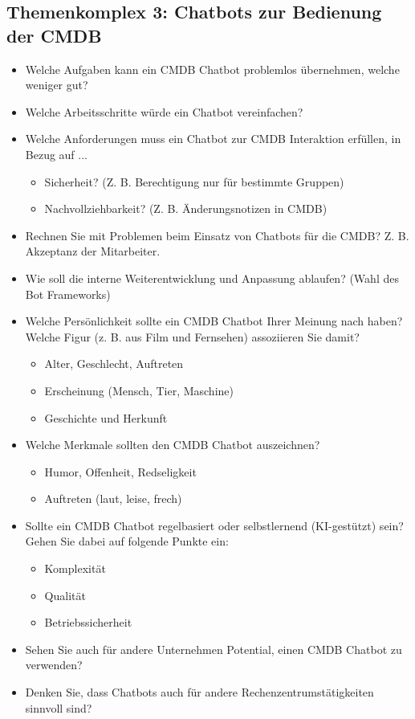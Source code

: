 \subsection*{Themenkomplex 3: Chatbots zur Bedienung der CMDB}
\begin{itemize}
  \item Welche Aufgaben kann ein CMDB Chatbot problemlos übernehmen, welche weniger gut?
  \item Welche Arbeitsschritte würde ein Chatbot vereinfachen?
  \item Welche Anforderungen muss ein Chatbot zur CMDB Interaktion erfüllen, in Bezug auf ...
  \begin{itemize}
    \item Sicherheit? (Z. B. Berechtigung nur für bestimmte Gruppen)
    \item Nachvollziehbarkeit? (Z. B. Änderungsnotizen in CMDB)
  \end{itemize}
  \item Rechnen Sie mit Problemen beim Einsatz von Chatbots für die CMDB? Z. B. Akzeptanz der Mitarbeiter.
  \item Wie soll die interne Weiterentwicklung und Anpassung ablaufen? (Wahl des Bot Frameworks)
  \item Welche Persönlichkeit sollte ein CMDB Chatbot Ihrer Meinung nach haben? Welche Figur (z. B. aus Film und Fernsehen) assoziieren Sie damit?
  \begin{itemize}
    \item Alter, Geschlecht, Auftreten
    \item Erscheinung (Mensch, Tier, Maschine)
    \item Geschichte und Herkunft
  \end{itemize}
  \item Welche Merkmale sollten den CMDB Chatbot auszeichnen?
  \begin{itemize}
    \item Humor, Offenheit, Redseligkeit
    \item Auftreten (laut, leise, frech)
  \end{itemize}
  \item Sollte ein CMDB Chatbot regelbasiert oder selbstlernend (KI-gestützt) sein? Gehen Sie dabei auf folgende Punkte ein:
  \begin{itemize}
    \item Komplexität
    \item Qualität
    \item Betriebssicherheit
  \end{itemize}
  \item Sehen Sie auch für andere Unternehmen Potential, einen CMDB Chatbot zu verwenden?
  \item Denken Sie, dass Chatbots auch für andere Rechenzentrumstätigkeiten sinnvoll sind?
\end{itemize}

